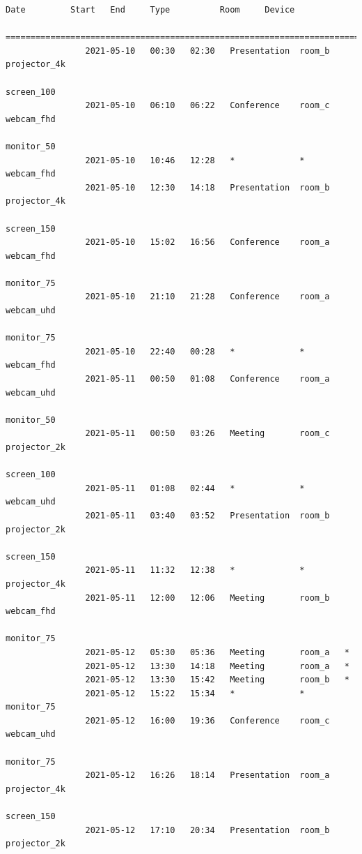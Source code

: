 \documentclass{article}
\begin{document}
\begin{Verbatim}[gobble=8]
                Date         Start   End     Type          Room     Device
                ===========================================================================
                2021-05-10   00:30   02:30   Presentation  room_b   projector_4k
                                                                    screen_100
                2021-05-10   06:10   06:22   Conference    room_c   webcam_fhd
                                                                    monitor_50
                2021-05-10   10:46   12:28   *             *        webcam_fhd
                2021-05-10   12:30   14:18   Presentation  room_b   projector_4k
                                                                    screen_150
                2021-05-10   15:02   16:56   Conference    room_a   webcam_fhd
                                                                    monitor_75
                2021-05-10   21:10   21:28   Conference    room_a   webcam_uhd
                                                                    monitor_75
                2021-05-10   22:40   00:28   *             *        webcam_fhd
                2021-05-11   00:50   01:08   Conference    room_a   webcam_uhd
                                                                    monitor_50
                2021-05-11   00:50   03:26   Meeting       room_c   projector_2k
                                                                    screen_100
                2021-05-11   01:08   02:44   *             *        webcam_uhd
                2021-05-11   03:40   03:52   Presentation  room_b   projector_2k
                                                                    screen_150
                2021-05-11   11:32   12:38   *             *        projector_4k
                2021-05-11   12:00   12:06   Meeting       room_b   webcam_fhd
                                                                    monitor_75
                2021-05-12   05:30   05:36   Meeting       room_a   *
                2021-05-12   13:30   14:18   Meeting       room_a   *
                2021-05-12   13:30   15:42   Meeting       room_b   *
                2021-05-12   15:22   15:34   *             *        monitor_75
                2021-05-12   16:00   19:36   Conference    room_c   webcam_uhd
                                                                    monitor_75
                2021-05-12   16:26   18:14   Presentation  room_a   projector_4k
                                                                    screen_150
                2021-05-12   17:10   20:34   Presentation  room_b   projector_2k

\end{Verbatim}
\end{document}
